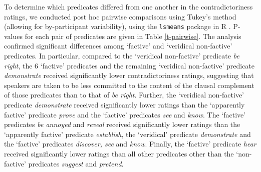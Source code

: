 \documentclass[11pt,fleqn]{article}
\newcommand{\6}{\mbox{$[\hspace*{-.6mm}[$}}
\newcommand{\9}{\mbox{$]\hspace*{-.6mm}]$}}
\begin{document}
{To determine which predicates differed from one another in the contradictoriness ratings, we conducted post hoc pairwise comparisons using Tukey's method (allowing for by-participant variability), using the \verb|lsmeans| package \citep{tukey} in R \citep{r}. P-values for each pair of predicates are given in Table \ref{t-pairwise}. The analysis confirmed significant differences among `factive' and `veridical non-factive' predicates. In particular, compared to the `veridical non-factive' predicate {\em be right}, the 6 `factive' predicates and the remaining `veridical non-factive' predicate {\em demonstrate} received significantly lower contradictoriness ratings, suggesting that speakers are taken to be less committed to the content of the clausal complement of those predicates than to that of {\em be right}. Further, the `veridical non-factive' predicate {\em demonstrate} received significantly lower ratings than the `apparently factive' predicate {\em prove} and the `factive' predicates {\em see} and {\em know}. The `factive' predicates {\em be annoyed} and {\em reveal} received significantly lower ratings than the `apparently factive' predicate {\em establish}, the `veridical' predicate {\em demonstrate} and the `factive' predicates {\em discover, see} and {\em know}. Finally, the `factive' predicate {\em hear} received significantly lower ratings than all other predicates other than the `non-factive' predicates {\em suggest} and {\em pretend}.

\begin{table}[H]
\setlength\tabcolsep{3pt}

\centering
\small

\begin{tabular}{l l l l l l l l l l l l l l l l l l l l }
\toprule


\end{tabular}
\end{table}}
\end{document}

